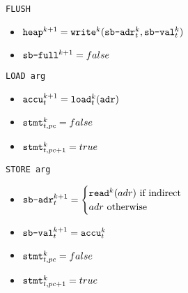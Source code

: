 \newpage
{}
{\texttt{FLUSH}}
{
  \begin{itemize}
    \item[] $\texttt{heap}^{k + 1} = \texttt{write}^k(\texttt{sb-adr}^k_t, \texttt{sb-val}^k_t)$
    \item[] $\texttt{sb-full}^{k + 1} = false$
  \end{itemize}
}

{\texttt{LOAD arg}}
{
  \begin{itemize}
    \item[] $\texttt{accu}^{k + 1}_t = \texttt{load}^k_t(\texttt{adr})$
    \item[] $\texttt{stmt}^k_{t, pc} = false$
    \item[] $\texttt{stmt}^k_{t, pc + 1} = true$
  \end{itemize}
}

{\texttt{STORE arg}}
{
  \begin{itemize}
    \item[] $\texttt{sb-adr}^{k + 1}_t =
      \begin{cases}
        \texttt{read}^k(adr) \text{ if indirect} \\
        adr \text{ otherwise}
      \end{cases}$
    \item[] $\texttt{sb-val}^{k + 1}_t = \texttt{accu}^k_t$
    \item[] $\texttt{stmt}^k_{t, pc} = false$
    \item[] $\texttt{stmt}^k_{t, pc + 1} = true$
  \end{itemize}
}

\newsavebox{\STORESBADRAXIOM}

